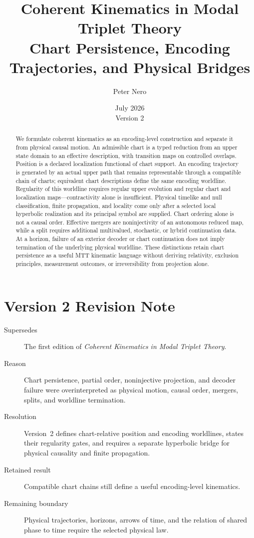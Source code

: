 \documentclass[11pt]{article}
\title{Coherent Kinematics in Modal Triplet Theory\\
\large Chart Persistence, Encoding Trajectories, and Physical Bridges}
\author{Peter Nero}
\date{July 2026\\Version 2}
\begin{document}
\maketitle
\seriestagline

\begin{abstract}
We formulate coherent kinematics as an encoding-level construction and
separate it from physical causal motion. An admissible chart is a typed
reduction from an upper state domain to an effective description, with
transition maps on controlled overlaps. Position is a declared localization
functional of chart support. An encoding trajectory is generated by an actual
upper path that remains representable through a compatible chain of charts;
equivalent chart descriptions define the same encoding worldline. Regularity
of this worldline requires regular upper evolution and regular chart and
localization maps---contractivity alone is insufficient. Physical timelike and
null classification, finite propagation, and locality come only after a
selected local hyperbolic realization and its principal symbol are supplied.
Chart ordering alone is not a causal order. Effective mergers are
noninjectivity of an autonomous reduced map, while a split requires additional
multivalued, stochastic, or hybrid continuation data. At a horizon, failure of
an exterior decoder or chart continuation does not imply termination of the
underlying physical worldline. These distinctions retain chart persistence as
a useful MTT kinematic language without deriving relativity, exclusion
principles, measurement outcomes, or irreversibility from projection alone.
\end{abstract}

\section*{Version 2 Revision Note}
\begin{description}
\item[Supersedes] The first edition of \emph{Coherent Kinematics in Modal
Triplet Theory}.
\item[Reason] Chart persistence, partial order, noninjective projection, and
decoder failure were overinterpreted as physical motion, causal order,
mergers, splits, and worldline termination.
\item[Resolution] Version~2 defines chart-relative position and encoding
worldlines, states their regularity gates, and requires a separate hyperbolic
bridge for physical causality and finite propagation.
\item[Retained result] Compatible chart chains still define a useful
encoding-level kinematics.
\item[Remaining boundary] Physical trajectories, horizons, arrows of time,
and the relation of shared phase to time require the selected physical law.
\end{description}
\end{document}
